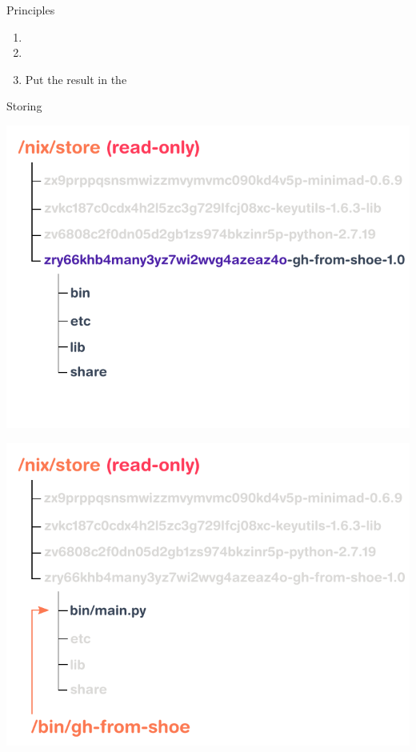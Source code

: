 \documentclass[aspectratio=169]{beamer}
\newcommand{\couleur}[2]{{\color{#1}{#2}}}
\begin{document}
\begin{frame}
    \begin{block}{Principles}
        \begin{enumerate}
            \item
                \couleur{dark-grey}{Describe a package and its
                dependencies in full}
            \item
                \couleur{dark-grey}{Build it in isolation}
            \item
                Put the result in the
                \couleur{orange-vivid-tangerine}{store}
        \end{enumerate}
    \end{block}
\end{frame}

\begin{frame}{Storing}
     {
\begin{center}
    \includegraphics[height=0.98\textheight]{img/schema-nix-store.pdf}
\end{center}
 }
     {
\begin{center}
    \includegraphics[height=0.98\textheight]{img/schema-nix-store-link.pdf}

\end{center}}
\end{frame}
\end{document}
